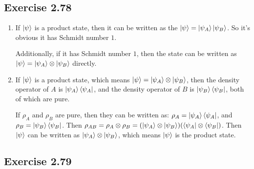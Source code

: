 \subsection*{Exercise 2.78}
\begin{enumerate}[(1)]
    \item If $\ket{\psi}$ is a product state, then it can be written as the $\ket{\psi}=\ket{\psi_A}\ket{\psi_B}$. So it's obvious it has Schmidt number $1$.
    
    Additionally, if it has Schmidt number $1$, then the state can be written as $\ket{\psi}=\ket{\psi_A}\otimes\ket{\psi_B}$ directly.
    
    \item If $\ket{\psi}$ is a product state, which means $\ket{\psi}=\ket{\psi_A}\otimes\ket{\psi_B}$, then the density operator of $A$ is $\ket{\psi_A}\bra{\psi_A}$, and the density operator of $B$ is $\ket{\psi_B}\bra{\psi_B}$, both of which are pure.
    
    If $\rho_A$ and $\rho_B$ are pure, then they can be written as: $\rho_A=\ket{\psi_A}\bra{\psi_A}$, and $\rho_B=\ket{\psi_B}\bra{\psi_B}$.
    Then $\rho_{AB}=\rho_A\otimes\rho_B=(\ket{\psi_A}\otimes\ket{\psi_B})(\bra{\psi_A}\otimes\bra{\psi_B})$. Then $\ket{\psi}$ can be written as $\ket{\psi_A}\otimes\ket{\psi_B}$, which means $\ket{\psi}$ is the product state.
\end{enumerate}

\subsection*{Exercise 2.79}

